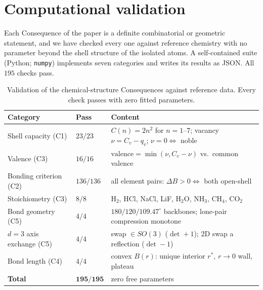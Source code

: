 \documentclass[11pt,a4paper]{article}
\theoremstyle{thmstyle}
\theoremstyle{definition}
\theoremstyle{remark}
\newcommand{\thick}{B}                 %
\newcommand{\Shellcap}{C}
\begin{document}
\section{Computational validation}
\label{sec:validation}

Each Consequence of the paper is a definite combinatorial or geometric
statement, and we have checked every one against reference chemistry with
no parameter beyond the shell structure of the isolated atoms. A
self-contained suite (Python; \texttt{numpy}) implements seven categories
and writes its results as JSON. All $195$ checks pass.

\begin{table}[h]
\centering\small
\caption{Validation of the chemical-structure Consequences against
reference data. Every check passes with zero fitted parameters.}
\label{tab:validation}
\begin{tabular}{lll}
\toprule
\textbf{Category} & \textbf{Pass} & \textbf{Content}\\
\midrule
Shell capacity (C1)        & $23/23$  & $\Shellcap(n)=2n^2$ for $n=1$--$7$;
                                        vacancy $\nu=\Shellcap_v-q_v$; $\nu=0\iff$ noble\\
Valence (C3)               & $16/16$  & $\mathrm{valence}=\min(\nu,\Shellcap_v-\nu)$
                                        vs.\ common valence\\
Bonding criterion (C2)     & $136/136$& all element pairs:
                                        $\Delta\thick>0\iff$ both open-shell\\
Stoichiometry (C3)         & $8/8$    & H$_2$, HCl, NaCl, LiF, H$_2$O,
                                        NH$_3$, CH$_4$, CO$_2$\\
Bond geometry (C5)         & $4/4$    & $180/120/109.47^\circ$ backbones;
                                        lone-pair compression monotone\\
$d{=}3$ axis exchange (C5) & $4/4$    & swap $\in SO(3)$ ($\det+1$);
                                        2D swap a reflection ($\det-1$)\\
Bond length (C4)           & $4/4$    & convex $\thick(r)$: unique interior
                                        $r^{*}$, $r{\to}0$ wall, plateau\\
\midrule
\textbf{Total}             & $\mathbf{195/195}$ & zero free parameters\\
\bottomrule
\end{tabular}
\end{table}
\end{document}
